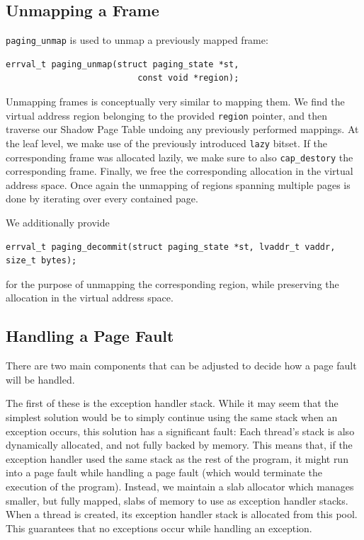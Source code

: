 \subsection{Unmapping a Frame}

\texttt{paging\_unmap} is used to unmap a previously mapped frame:
\begin{lstlisting}[caption={Unmapping a Frame}]
    errval_t paging_unmap(struct paging_state *st, 
                          const void *region);
\end{lstlisting}

Unmapping frames is conceptually very similar to mapping them. We find the virtual address region belonging to the provided \texttt{region} pointer, and then traverse our Shadow Page Table undoing any previously performed mappings. At the leaf level, we make use of the previously introduced \texttt{lazy} bitset. If the corresponding frame was allocated lazily, we make sure to also \texttt{cap\_destory} the corresponding frame. Finally, we free the corresponding allocation in the virtual address space. Once again the unmapping of regions spanning multiple pages is done by iterating over every contained page.

We additionally provide
\begin{lstlisting}[caption={Mapping a Frame}]
errval_t paging_decommit(struct paging_state *st, lvaddr_t vaddr, size_t bytes);
\end{lstlisting}
for the purpose of unmapping the corresponding region, while preserving the allocation in the virtual address space.

\subsection{Handling a Page Fault}

There are two main components that can be adjusted to decide how a page fault will be handled.

The first of these is the exception handler stack. While it may seem that the simplest solution would be to simply continue using the same stack when an exception occurs, this solution has a significant fault: Each thread's stack is also dynamically allocated, and not fully backed by memory. This means that, if the exception handler used the same stack as the rest of the program, it might run into a page fault while handling a page fault (which would terminate the execution of the program). Instead, we maintain a slab allocator which manages smaller, but fully mapped, slabs of memory to use as exception handler stacks. When a thread is created, its exception handler stack is allocated from this pool. This guarantees that no exceptions occur while handling an exception.

